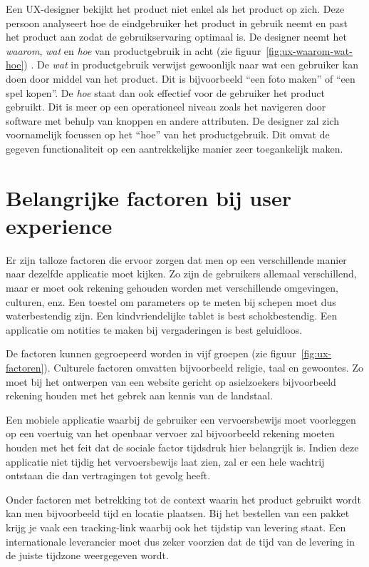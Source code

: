 Een UX-designer bekijkt het product niet enkel als het product op zich. Deze persoon analyseert hoe de eindgebruiker het product in gebruik neemt en past het product aan zodat de gebruikservaring optimaal is. De designer neemt het \textit{waarom}, \textit{wat} en \textit{hoe} van productgebruik in acht (zie figuur~\ref{fig:ux-waarom-wat-hoe}) \autocite{Hassenzahl2013}. De \textit{wat} in productgebruik verwijst gewoonlijk naar wat een gebruiker kan doen door middel van het product. Dit is bijvoorbeeld ``een foto maken'' of ``een spel kopen''. De \textit{hoe} staat dan ook effectief voor de gebruiker het product gebruikt. Dit is meer op een operationeel niveau zoals het navigeren door software met behulp van knoppen en andere attributen. De designer zal zich voornamelijk focussen op het ``hoe'' van het productgebruik. Dit omvat de gegeven functionaliteit op een aantrekkelijke manier zeer toegankelijk maken.

\section{Belangrijke factoren bij user experience}
\label{sec:belangrijke-factoren-bij-user-experience}

Er zijn talloze factoren die ervoor zorgen dat men op een verschillende manier naar dezelfde applicatie moet kijken. Zo zijn de gebruikers allemaal verschillend, maar er moet ook rekening gehouden worden met verschillende omgevingen, culturen, enz. Een toestel om parameters op te meten bij schepen moet dus waterbestendig zijn. Een kindvriendelijke tablet is best schokbestendig. Een applicatie om notities te maken bij vergaderingen is best geluidloos.

De factoren kunnen gegroepeerd worden in vijf groepen (zie figuur~\ref{fig:ux-factoren}). Culturele factoren omvatten bijvoorbeeld religie, taal en gewoontes. Zo moet bij het ontwerpen van een website gericht op asielzoekers bijvoorbeeld rekening houden met het gebrek aan kennis van de landstaal.

Een mobiele applicatie waarbij de gebruiker een vervoersbewijs moet voorleggen op een voertuig van het openbaar vervoer zal bijvoorbeeld rekening moeten houden met het feit dat de sociale factor tijdsdruk hier belangrijk is. Indien deze applicatie niet tijdig het vervoersbewijs laat zien, zal er een hele wachtrij ontstaan die dan vertragingen tot gevolg heeft.

Onder factoren met betrekking tot de context waarin het product gebruikt wordt kan men bijvoorbeeld tijd en locatie plaatsen. Bij het bestellen van een pakket krijg je vaak een tracking-link waarbij ook het tijdstip van levering staat. Een internationale leverancier moet dus zeker voorzien dat de tijd van de levering in de juiste tijdzone weergegeven wordt.

